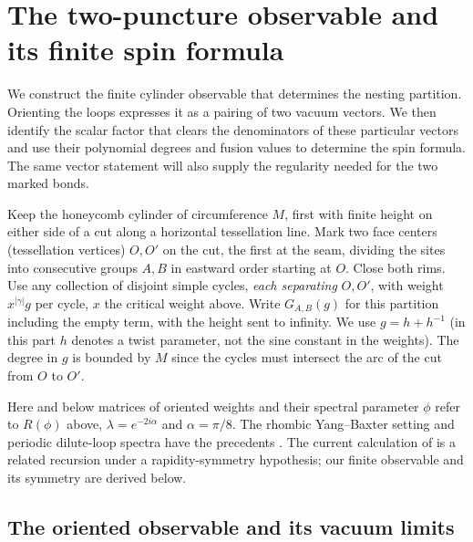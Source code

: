 \section{The two-puncture observable and its finite spin formula}\label{c7:finite}

We construct the finite cylinder observable that determines the nesting
partition. Orienting the loops expresses it as a pairing of two vacuum
vectors. We then identify the scalar factor that clears the denominators
of these particular vectors and use their polynomial degrees and fusion
values to determine the spin formula. The same vector statement will
also supply the regularity needed for the two marked bonds.

Keep the honeycomb cylinder of circumference $M$, first with finite height on either side of a cut along a horizontal tessellation line. Mark two face centers (tessellation vertices) $O,O'$ on the cut, the first at the seam, dividing the sites into consecutive groups $A,B$ in eastward order starting at $O$. Close both rims. Use any collection of disjoint simple cycles, \emph{each separating} $O,O'$, with weight $x^{|\gamma|}g$ per cycle, $x$ the critical weight above. Write $G_{A,B}(g)$ for this partition including the empty term, with the height sent to infinity. We use $g=h+h^{-1}$ (in this part $h$ denotes a twist parameter, not the sine constant in the weights). The degree in $g$ is bounded by $M$ since the cycles must intersect the arc of the cut from $O$ to $O'$.

Here and below matrices of oriented weights and their spectral parameter $\phi$ refer to $R(\phi)$ above, $\lambda=e^{-2i\alpha}$ and $\alpha=\pi/8$. The rhombic Yang--Baxter setting and periodic dilute-loop spectra have the precedents \cite{GlazmanManolescu2017,ZhouBatchelor1997}. The current calculation of \cite[Section~6]{FeherNienhuis2018} is a related recursion under a rapidity-symmetry hypothesis; our finite observable and its symmetry are derived below.

\subsection{The oriented observable and its vacuum limits}

